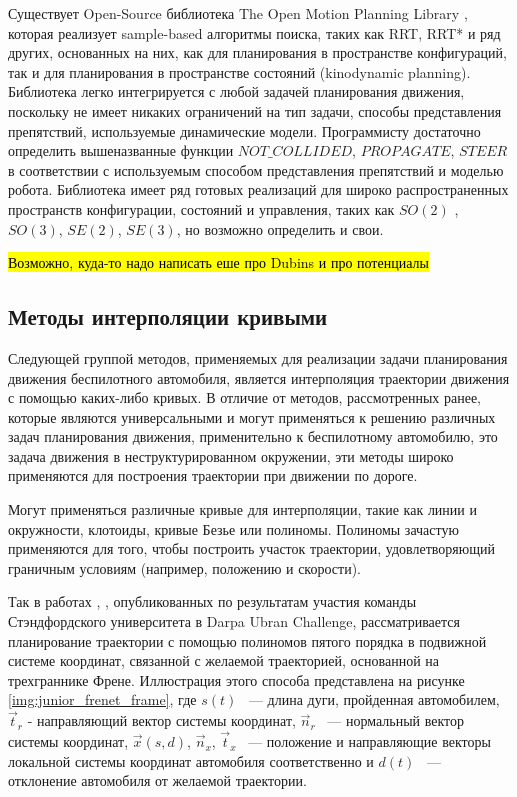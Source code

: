Существует Open-Source библиотека The Open Motion Planning Library \cite{motion_planning_ompl}, которая реализует
sample-based алгоритмы поиска, таких как RRT, RRT* и ряд других, основанных на них, как для планирования в
пространстве конфигураций, так и для планирования в пространстве состояний (kinodynamic planning). Библиотека легко
интегрируется с любой задачей планирования движения, поскольку не имеет никаких ограничений на тип задачи, способы
представления препятствий, используемые динамические модели. Программисту достаточно определить вышеназванные
функции $NOT\_COLLIDED$, $PROPAGATE$, $STEER$ в соответствии с используемым способом представления препятствий и моделью
робота. Библиотека имеет ряд готовых реализаций для широко распространенных пространств конфигурации, состояний и
управления, таких как $SO(2)$ , $SO(3)$, $SE(2)$, $SE(3)$, но возможно определить и свои.


\hl{Возможно, куда-то надо написать еше про Dubins и про потенциалы}

\subsection{Методы интерполяции кривыми}

Следующей группой методов, применяемых для реализации задачи планирования движения беспилотного
автомобиля, является интерполяция траектории движения с помощью каких-либо кривых. В отличие от
методов, рассмотренных ранее, которые являются универсальными и могут применяться к решению
различных задач планирования движения, применительно к беспилотному автомобилю, это задача движения
в неструктурированном окружении,  эти методы широко применяются для построения траектории при движении
по дороге.

Могут применяться различные кривые для интерполяции, такие как линии и окружности, клотоиды, кривые Безье
или полиномы. Полиномы зачастую применяются для того, чтобы построить участок траектории, удовлетворяющий
граничным условиям (например, положению и скорости).

Так в работах \cite{darpa_junior_path_planning}, \cite{darpa_junior_frenet},
опубликованных по результатам участия команды Стэндфордского университета в Darpa Ubran Challenge,
рассматривается планирование траектории с помощью полиномов пятого порядка в подвижной системе координат,
связанной с желаемой траекторией, основанной на трехграннике Френе. Иллюстрация этого способа представлена на
рисунке \ref{img:junior_frenet_frame}, где
$s(t)$  ~--- длина дуги, пройденная автомобилем, $\vec{t}_r$ - направляющий вектор системы координат,
$\vec{n}_r$  ~--- нормальный вектор системы координат, $\vec{x}(s,d)$, $\vec{n}_x$,
$\vec{t}_x$ ~--- положение и направляющие векторы локальной системы координат автомобиля соответственно и
$d(t)$ ~--- отклонение автомобиля от желаемой траектории.

